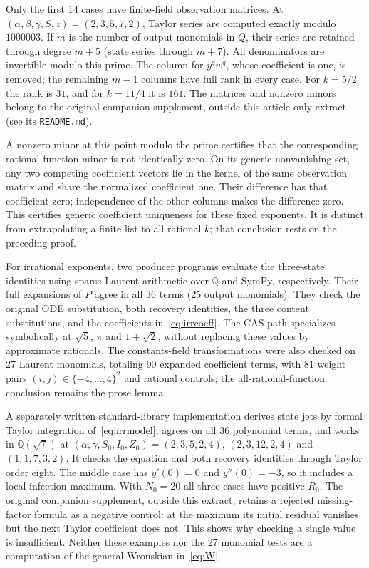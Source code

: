 \documentclass[10pt,a4paper]{article}
\theoremstyle{definition}\newtheorem{definition}[theorem]{Definition}
\begin{document}
Only the first 14 cases have finite-field observation matrices.
At $(\alpha,\beta,\gamma,S,z)=(2,3,5,7,2)$, Taylor series are computed
exactly modulo $1000003$. If $m$ is the number of output monomials
in $Q$, their series are retained through degree $m+5$ (state series
through $m+7$). All denominators are invertible modulo this prime.
The column for $y^q w^q$, whose coefficient is one, is removed;
the remaining $m-1$ columns have full rank in every case. For
$k=5/2$ the rank is $31$, and for $k=11/4$ it is $161$.
The matrices and nonzero minors belong to the original companion
supplement, outside this article-only extract (see its \texttt{README.md}).

A nonzero minor at this point modulo the prime certifies that the
corresponding rational-function minor is not identically zero.
On its generic nonvanishing set, any two competing coefficient
vectors lie in the kernel of the same observation matrix and share
the normalized coefficient one. Their difference has that coefficient
zero; independence of the other columns makes the difference zero.
This certifies generic coefficient uniqueness for these fixed
exponents. It is distinct from extrapolating a finite list to all
rational $k$; that conclusion rests on the preceding proof.


For irrational exponents, two producer programs evaluate the
three-state identities using sparse Laurent arithmetic over
$\mathbb Q$ and SymPy, respectively. Their full expansions of $P$
agree in all 36 terms (25 output monomials). They check the original
ODE substitution, both recovery identities, the three content
substitutions, and the coefficients in~\eqref{eq:irrcoeff}.
The CAS path specializes symbolically at $\sqrt5$, $\pi$ and
$1+\sqrt2$, without replacing these values by approximate rationals.
The constants-field transformations were also checked on 27
Laurent monomials, totaling 90 expanded coefficient terms, with
81 weight pairs $(i,j)\in\{-4,\ldots,4\}^2$ and rational controls;
the all-rational-function conclusion remains the prose lemma.

A separately written standard-library implementation derives state
jets by formal Taylor integration of~\eqref{eq:irrmodel}, agrees on
all 36 polynomial terms, and works in $\mathbb Q(\sqrt7)$ at
$(\alpha,\gamma,S_0,I_0,Z_0)=(2,3,5,2,4)$, $(2,3,12,2,4)$ and
$(1,1,7,3,2)$. It checks the equation and both recovery identities
through Taylor order eight. The middle case has $y'(0)=0$ and
$y''(0)=-3$, so it includes a local infection maximum. With $N_0=20$
all three cases have positive $R_0$. The original companion supplement,
outside this extract, retains a rejected missing-factor formula as a
negative control: at the
maximum its initial residual vanishes but the next Taylor coefficient
does not. This shows why checking a single value is insufficient.
Neither these examples nor the 27 monomial tests are a computation
of the general Wronskian in~\eqref{eq:W}.
\end{document}
